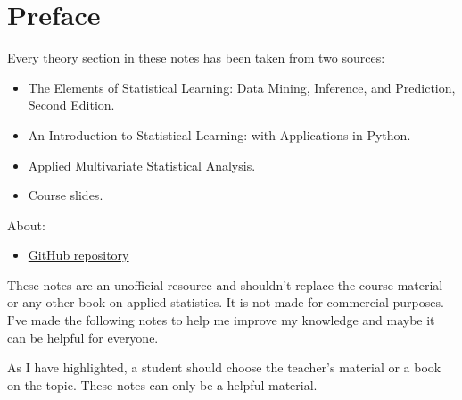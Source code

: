 \section*{Preface}

Every theory section in these notes has been taken from two sources:
\begin{itemize}
    \item The Elements of Statistical Learning: Data Mining, Inference, and Prediction, Second Edition. \cite{hastie2009elements}
    \item An Introduction to Statistical Learning: with Applications in Python.\cite{james2013introduction}
    \item Applied Multivariate Statistical Analysis.\cite{johnson2007applied}
    \item Course slides.\cite{course-slides-polimi}
\end{itemize}
About:
\begin{itemize}
    \item[\faIcon{github}] \href{https://github.com/PoliMI-HPC-E-notes-projects-AndreVale69/HPC-E-PoliMI-university-notes}{GitHub repository}
    \begin{center}
    \end{center}
\end{itemize}
These notes are an unofficial resource and shouldn't replace the course material or any other book on applied statistics. It is not made for commercial purposes. I've made the following notes to help me improve my knowledge and maybe it can be helpful for everyone.

As I have highlighted, a student should choose the teacher's material or a book on the topic. These notes can only be a helpful material.